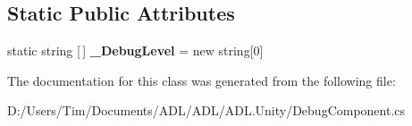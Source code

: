\subsection*{Static Public Attributes}
\begin{DoxyCompactItemize}
\item 
\mbox{\label{class_a_d_l_1_1_unity_1_1_debug_component_aa23a2532fabf926cc33761d6891251ea}} 
static string \mbox{[}$\,$\mbox{]} {\bfseries \+\_\+\+Debug\+Level} = new string\mbox{[}0\mbox{]}
\end{DoxyCompactItemize}


The documentation for this class was generated from the following file\+:\begin{DoxyCompactItemize}
\item 
D\+:/\+Users/\+Tim/\+Documents/\+A\+D\+L/\+A\+D\+L/\+A\+D\+L.\+Unity/Debug\+Component.\+cs\end{DoxyCompactItemize}
